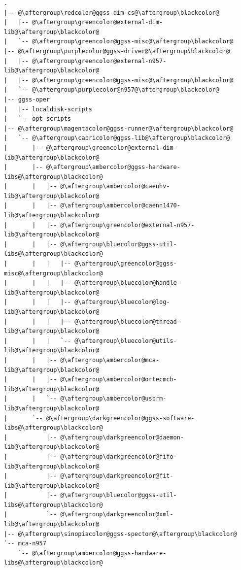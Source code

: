 \begin{lstlisting}[language=Cmd, caption={Aktualna struktura katalogów}, label={lst:newStructure}, escapechar=@]
.
|-- @\aftergroup\redcolor@ggss-dim-cs@\aftergroup\blackcolor@
|   |-- @\aftergroup\greencolor@external-dim-lib@\aftergroup\blackcolor@
|   `-- @\aftergroup\greencolor@ggss-misc@\aftergroup\blackcolor@
|-- @\aftergroup\purplecolor@ggss-driver@\aftergroup\blackcolor@
|   |-- @\aftergroup\greencolor@external-n957-lib@\aftergroup\blackcolor@
|   |-- @\aftergroup\greencolor@ggss-misc@\aftergroup\blackcolor@
|   `-- @\aftergroup\purplecolor@n957@\aftergroup\blackcolor@
|-- ggss-oper
|   |-- localdisk-scripts
|   `-- opt-scripts
|-- @\aftergroup\magentacolor@ggss-runner@\aftergroup\blackcolor@
|   `-- @\aftergroup\capricolor@ggss-lib@\aftergroup\blackcolor@
|       |-- @\aftergroup\greencolor@external-dim-lib@\aftergroup\blackcolor@
|       |-- @\aftergroup\ambercolor@ggss-hardware-libs@\aftergroup\blackcolor@
|       |   |-- @\aftergroup\ambercolor@caenhv-lib@\aftergroup\blackcolor@
|       |   |-- @\aftergroup\ambercolor@caenn1470-lib@\aftergroup\blackcolor@
|       |   |-- @\aftergroup\greencolor@external-n957-lib@\aftergroup\blackcolor@
|       |   |-- @\aftergroup\bluecolor@ggss-util-libs@\aftergroup\blackcolor@
|       |   |   |-- @\aftergroup\greencolor@ggss-misc@\aftergroup\blackcolor@
|       |   |   |-- @\aftergroup\bluecolor@handle-lib@\aftergroup\blackcolor@
|       |   |   |-- @\aftergroup\bluecolor@log-lib@\aftergroup\blackcolor@
|       |   |   |-- @\aftergroup\bluecolor@thread-lib@\aftergroup\blackcolor@
|       |   |   `-- @\aftergroup\bluecolor@utils-lib@\aftergroup\blackcolor@
|       |   |-- @\aftergroup\ambercolor@mca-lib@\aftergroup\blackcolor@
|       |   |-- @\aftergroup\ambercolor@ortecmcb-lib@\aftergroup\blackcolor@
|       |   `-- @\aftergroup\ambercolor@usbrm-lib@\aftergroup\blackcolor@
|       `-- @\aftergroup\darkgreencolor@ggss-software-libs@\aftergroup\blackcolor@
|           |-- @\aftergroup\darkgreencolor@daemon-lib@\aftergroup\blackcolor@
|           |-- @\aftergroup\darkgreencolor@fifo-lib@\aftergroup\blackcolor@
|           |-- @\aftergroup\darkgreencolor@fit-lib@\aftergroup\blackcolor@
|           |-- @\aftergroup\bluecolor@ggss-util-libs@\aftergroup\blackcolor@
|           `-- @\aftergroup\darkgreencolor@xml-lib@\aftergroup\blackcolor@
|-- @\aftergroup\sinopiacolor@ggss-spector@\aftergroup\blackcolor@
`-- mca-n957
    `-- @\aftergroup\ambercolor@ggss-hardware-libs@\aftergroup\blackcolor@
\end{lstlisting}

